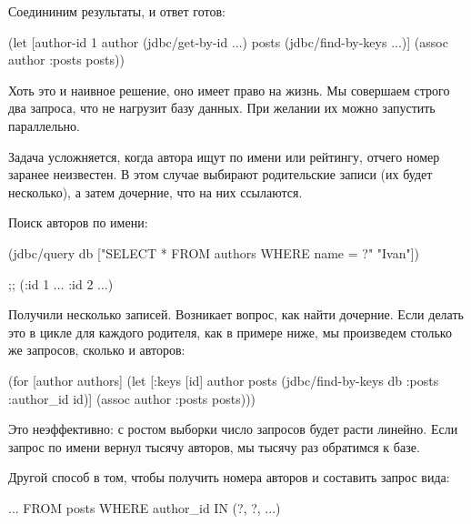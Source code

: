 Соедининим результаты, и ответ готов:

\begin{english}
  \begin{clojure}
(let [author-id 1
      author (jdbc/get-by-id ...)
      posts (jdbc/find-by-keys ...)]
  (assoc author :posts posts))
  \end{clojure}
\end{english}

Хоть это и наивное решение, оно имеет право на жизнь. Мы совершаем строго два запроса, что не нагрузит базу данных. При желании их можно запустить параллельно.

Задача усложняется, когда автора ищут по имени или рейтингу, отчего номер заранее неизвестен. В этом случае выбирают родительские записи (их будет несколько), а затем дочерние, что на них ссылаются.

Поиск авторов по имени:

\begin{english}
  \begin{clojure}
(jdbc/query db ["SELECT * FROM authors
                 WHERE name = ?" "Ivan"])

;; ({:id 1 ...} {:id 2 ...})
  \end{clojure}
\end{english}

Получили несколько записей. Возникает вопрос, как найти дочерние. Если делать это в цикле для каждого родителя, как в примере ниже, мы произведем столько же запросов, сколько и авторов:

\begin{english}
  \begin{clojure}
(for [author authors]
  (let [{:keys [id]} author
        posts (jdbc/find-by-keys
                db :posts {:author_id id})]
    (assoc author :posts posts)))
  \end{clojure}
\end{english}

Это неэффективно: с ростом выборки число запросов будет расти линейно. Если запрос по имени вернул тысячу авторов, мы тысячу раз обратимся к базе.

Другой способ в том, чтобы получить номера авторов и составить запрос вида:

\begin{english}
  \begin{sql}
... FROM posts WHERE author_id IN (?, ?, ...)
  \end{sql}
\end{english}

